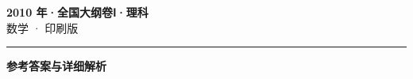 \documentclass[zihao=5, a4paper]{ctexart}
\begin{document}
\begin{center}
  {\Large\bfseries 2010 年·全国大纲卷Ⅰ·理科}\\[4pt]
  {\large 数学 · 印刷版}
\end{center}
\medskip
{}

\par\bigskip\hrule\bigskip
{}
\begin{center}{\large\bfseries 参考答案与详细解析}\end{center}
\smallskip

\end{document}
